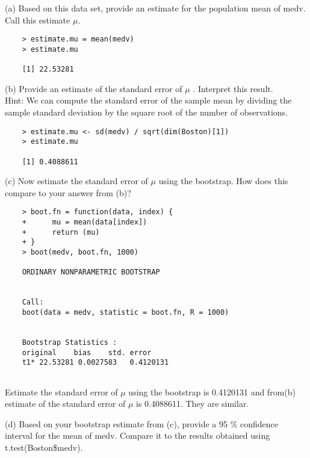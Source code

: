 \documentclass{article}
\begin{document}
\newpage

(a) Based on this data set, provide an estimate for the population mean of medv. Call this estimate $\mu$.\\

\begin{program}
	\begin{verbatim}
	> estimate.mu = mean(medv)
	> estimate.mu
	
	[1] 22.53281
	\end{verbatim}
\end{program}





(b) Provide an estimate of the standard error of $\mu$ . Interpret this result.\\
Hint: We can compute the standard error of the sample mean by dividing the sample standard deviation by the square root of the number of observations.

\begin{program}
	\begin{verbatim}
	> estimate.mu <- sd(medv) / sqrt(dim(Boston)[1])
	> estimate.mu
	
	[1] 0.4088611
	\end{verbatim}
\end{program}



(c) Now estimate the standard error of $\mu$ using the bootstrap. How does this compare to your answer from (b)?


\begin{program}
	\begin{verbatim}
	> boot.fn = function(data, index) {
	+      mu = mean(data[index])
	+      return (mu) 
	+ }
	> boot(medv, boot.fn, 1000)
	
	ORDINARY NONPARAMETRIC BOOTSTRAP
	
	
	Call:
	boot(data = medv, statistic = boot.fn, R = 1000)
	
	
	Bootstrap Statistics :
	original    bias    std. error
	t1* 22.53281 0.0027583   0.4120131
	
	\end{verbatim}
\end{program}

Estimate the standard error of $\mu$ using the bootstrap is 0.4120131 and from(b) estimate of the standard error of $\mu$ is 0.4088611. They are similar.

\newpage

(d) Based on your bootstrap estimate from (c), provide a 95 \% confidence interval for the mean of medv. Compare it to the results obtained using t.test(Boston\$medv).\\
\end{document}

